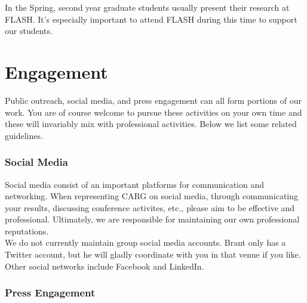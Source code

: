 \documentclass[fleqn,10pt]{wlscirep}
\begin{document}
\noindent
In the Spring, second year 
graduate students
usually present their research at
FLASH. It's especially important
to attend FLASH during this
time to support our students.




\newpage
\section{Engagement}
\label{sec:engagement}

Public outreach,
social media, and 
press engagement can
all form portions of our
work. You are of course 
welcome to pursue these
activities on your own
time and these will invariably
mix with professional 
activities. Below we 
list some related
guidelines.


\subsubsection{Social Media}
\label{sec:social_media}

Social media consist
of an important
platforms for communication
and networking.
When representing CARG
on social media, through
communicating your results,
discussing conference
activites, etc., please 
aim to be effective and
professional.
Ultimately, we are responsible
for maintaining our own
professional reputations.\\
\noindent
We do not currently maintain
group social media accounts.
Brant only has a Twitter 
account, but he will gladly
coordinate with you in
that venue if you like.
Other social networks
include Facebook and
LinkedIn.

\subsubsection{Press Engagement}
\label{sec:press_engagement}
\end{document}
